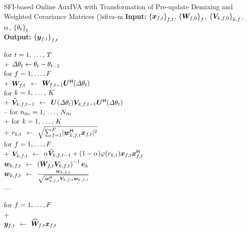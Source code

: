 \documentclass[sip,biber]{now-journal}
\begin{document}
\begin{algorithm}{SFI-based Online AuxIVA with Transformation of Pre-update Demixing and Weighted Covariance Matrices (\SFIIVAm)}{sfiva-m}
  \textbf{Input:} ${\{\Obs _{\ft}\}} _{\ft}$, ${\{\bm{W} _{f,0}\}} _{f}$, ${\{\bm{V} _{k,f,0}\}} _{k,f}$, $\alpha$, ${\{\theta _{t}\}} _{t}$ \\
  \textbf{Output:} ${\{\Est _{\ft}\}} _{\ft}$
  \begin{pseudo}

    for $t = 1,\, \dots,\, T$ \\+
      $\varDelta \theta _{t} \gets \theta _{t} - \theta _{t - 1}$ \\
      for $f = 1, \dots, F$ \\+
        {$\bm{W} _{f,t}$} $\gets$ $\bm{W} _{f,t - 1} \bm{U} ^{\mathsf{H}} (\varDelta\theta _{t})$ \ct{\eqref{eq:sfiiva:demix}} \\
        for $k = 1,\, \dots,\, K$ \\+
          {$\refpos{\cov} _{\src,\ft[-1]}$} $\gets$ $\rotMat (\varDelta\rotSpat _{\tframe}) \cov _{\src,\ft[-1]} \rotMat ^{\hermite} (\varDelta \rotSpat _{\tframe})$ \ct{\eqref{eq:sfiiva:cov}} \\--
      for $n _{\mathrm{itr}} = 1,\, \dots,\, N _{\mathrm{itr}}$ \\+
        for $k = 1,\, \dots,\, K$ \\+
          {$r _{k,t}$} $\gets$ $\sqrt{\sum _{\freq = 1} ^{\Freq} \abs{\demix _{\src,\ft} ^{\hermite} \Obs _{\ft}} ^2}$ \ct{\eqref{eq:var}} \\
          for $f = 1, \dots, F$ \\+
            {$\cov _{\src,\ft}    $} $\gets$ $\forget \refpos{\cov} _{\src,\ft[-1]} + (1 - \forget) \weight(\var _{\src,\tframe}) \Obs _{\ft} \Obs _{\ft} ^{\hermite}$ \\
            {$\demix _{\src,\ft}$} $\gets$ $\left(\Demix _{\ft} \cov _{\src,\ft}\right) ^{-1} \eye _{\src}$ \ct{\eqref{eq:ip:proj}} \\
            {$\demix _{\src,\ft}$} $\gets$ $\frac{\demix _{\src,\ft}}{\sqrt{\demix _{\src,\ft} ^{\hermite} \cov _{\src,\ft} \demix _{\src,\ft}}}$ \ct{\eqref{eq:ip:norm}} \\---

      for $f = 1, \dots, F$ \\+
         \ct{\eqref{eq:pb:w}}\\
        {$\Est _{\ft}$} $\gets$ $\proj{\Demix }_{\ft} \Obs _{\ft}$ \ct{\eqref{eq:pb:y}}
  \end{pseudo}
\end{algorithm}
\end{document}

